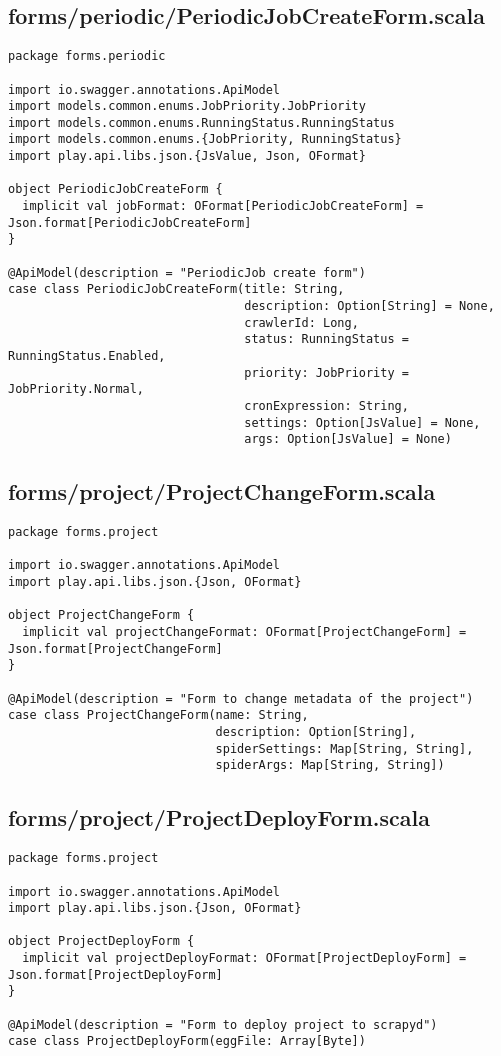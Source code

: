 \subsection{forms/periodic/PeriodicJobCreateForm.scala}
\begin{lstlisting}
package forms.periodic

import io.swagger.annotations.ApiModel
import models.common.enums.JobPriority.JobPriority
import models.common.enums.RunningStatus.RunningStatus
import models.common.enums.{JobPriority, RunningStatus}
import play.api.libs.json.{JsValue, Json, OFormat}

object PeriodicJobCreateForm {
  implicit val jobFormat: OFormat[PeriodicJobCreateForm] = Json.format[PeriodicJobCreateForm]
}

@ApiModel(description = "PeriodicJob create form")
case class PeriodicJobCreateForm(title: String,
                                 description: Option[String] = None,
                                 crawlerId: Long,
                                 status: RunningStatus = RunningStatus.Enabled,
                                 priority: JobPriority = JobPriority.Normal,
                                 cronExpression: String,
                                 settings: Option[JsValue] = None,
                                 args: Option[JsValue] = None)
\end{lstlisting}
\subsection{forms/project/ProjectChangeForm.scala}
\begin{lstlisting}
package forms.project

import io.swagger.annotations.ApiModel
import play.api.libs.json.{Json, OFormat}

object ProjectChangeForm {
  implicit val projectChangeFormat: OFormat[ProjectChangeForm] = Json.format[ProjectChangeForm]
}

@ApiModel(description = "Form to change metadata of the project")
case class ProjectChangeForm(name: String,
                             description: Option[String],
                             spiderSettings: Map[String, String],
                             spiderArgs: Map[String, String])
\end{lstlisting}
\subsection{forms/project/ProjectDeployForm.scala}
\begin{lstlisting}
package forms.project

import io.swagger.annotations.ApiModel
import play.api.libs.json.{Json, OFormat}

object ProjectDeployForm {
  implicit val projectDeployFormat: OFormat[ProjectDeployForm] = Json.format[ProjectDeployForm]
}

@ApiModel(description = "Form to deploy project to scrapyd")
case class ProjectDeployForm(eggFile: Array[Byte])
\end{lstlisting}
